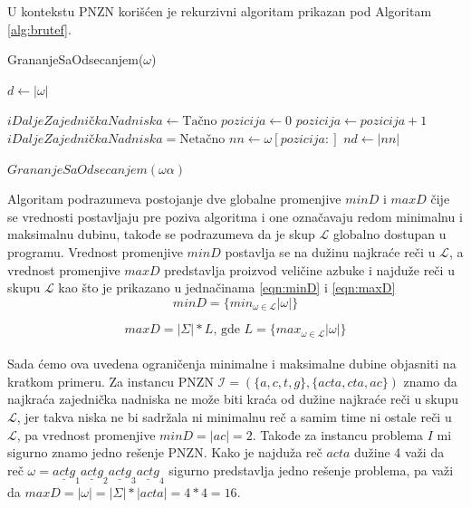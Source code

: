 \documentclass[12pt,oneside]{memoir}
\begin{document}
U kontekstu PNZN korišćen je rekurzivni algoritam prikazan pod Algoritam \ref{alg:brutef}.
\begin{algorithm}
  \caption{GrananjeSaOdsecanjem($\omega$)}
  \label{alg:brutef}
  \begin{algorithmic}[1]
  \State $d \gets |\omega|$ 
      \State \Return
  \EndIf

      \State $iDaljeZajedničkaNadniska \gets \textrm{Tačno}$
      \State $pozicija \gets 0$
       
          \State $pozicija \gets pozicija + 1$
        \Else
          \State $iDaljeZajedničkaNadniska = \textrm{Netačno}$
        \EndIf
      \EndWhile
      \State $nn \gets \omega[pozicija:]$ 
      \State $nd \gets |nn|$ 
  \EndIf

  \For{$\alpha \in \Sigma$} 
        \State $GrananjeSaOdsecanjem(\omega\alpha)$
  \EndFor
  \end{algorithmic}
  \end{algorithm}
Algoritam podrazumeva postojanje dve globalne promenjive $minD$ i $maxD$ čije se vrednosti postavljaju pre
poziva algoritma i one označavaju redom minimalnu i maksimalnu dubinu, takođe se podrazumeva da je skup $\mathcal{L}$
globalno dostupan u programu. Vrednost promenjive $minD$ postavlja
se na dužinu najkraće reči u $\mathcal{L}$, a vrednost promenjive $maxD$ predstavlja proizvod veličine azbuke
i najduže reči u skupu $\mathcal{L}$ kao što je prikazano u jednačinama \ref{eqn:minD} i \ref{eqn:maxD}
\\
\begin{equation}
  \label{eqn:minD}
  minD=\{min_{\omega\in\mathcal{L}}|\omega|\}
\end{equation}

\begin{equation}
  \label{eqn:maxD}
  maxD=|\Sigma| * L \textrm{, gde } L=\{max_{\omega\in\mathcal{L}}|\omega|\}
\end{equation}
\\
Sada ćemo ova uvedena ograničenja minimalne i maksimalne dubine objasniti na kratkom primeru.
Za instancu PNZN $\mathcal{I}=(\{a,c,t,g\},\{acta,cta,ac\})$ znamo da najkraća zajednička nadniska
ne može biti kraća od dužine najkraće reči u skupu $\mathcal{L}$, jer takva niska ne bi sadržala ni
minimalnu reč a samim time ni ostale reči u $\mathcal{L}$, pa vrednost promenjive $minD=|ac|=2$. Takođe za 
instancu problema $I$ mi sigurno znamo jedno rešenje PNZN. Kako je najduža reč $acta$ dužine 4 
važi da reč $\omega=\underline{actg}_{1}\underline{actg}_{2}\underline{actg}_{3}\underline{actg}_{4}$
sigurno predstavlja jedno rešenje problema, pa važi da $maxD=|\omega|=|\Sigma|*|acta| = 4 * 4 = 16$.
\end{document}
